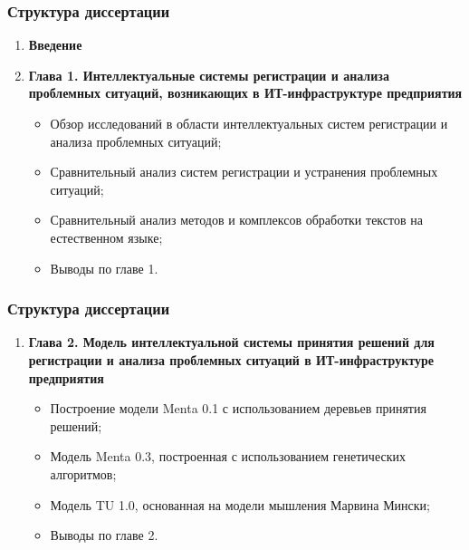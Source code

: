 \documentclass[14pt]{beamer}
\begin{document}
\begin{frame}
\frametitle{Структура диссертации}
\begin{enumerate}
\item \textbf{Введение}
  \item \textbf{Глава 1. Интеллектуальные системы регистрации и анализа проблемных ситуаций, возникающих в ИТ-инфраструктуре предприятия}
  \begin{itemize}
    \item Обзор исследований в области интеллектуальных систем регистрации и анализа проблемных ситуаций;
    \item Сравнительный анализ систем регистрации и устранения проблемных ситуаций;
    \item Сравнительный анализ методов и комплексов обработки текстов на естественном языке;
    \item Выводы по главе 1.
  \end{itemize}
 \end{enumerate}
\end{frame}

\begin{frame}
\frametitle{Структура диссертации}
\begin{enumerate}
  \item \textbf{Глава 2. Модель интеллектуальной системы принятия решений для регистрации и анализа проблемных ситуаций в ИТ-инфраструктуре предприятия}
  \begin{itemize}
    \item Построение модели Menta 0.1 с использованием деревьев принятия решений;
    \item Модель Menta 0.3, построенная с использованием генетических алгоритмов;
    \item Модель TU 1.0, основанная на модели мышления Марвина Мински;
    \item Выводы по главе 2.
  \end{itemize}
\end{enumerate}
\end{frame}
\end{document}

